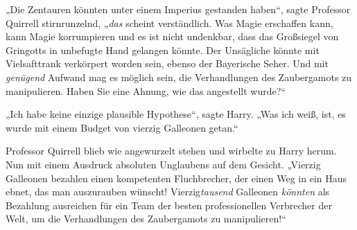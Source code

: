 „Die Zentauren könnten unter einem Imperius gestanden haben“, sagte Professor Quirrell stirnrunzelnd, „\emph{das} scheint verständlich. Was Magie erschaffen kann, kann Magie korrumpieren und es ist nicht undenkbar, dass das Großsiegel von Gringotts in unbefugte Hand gelangen könnte. Der Unsägliche könnte mit Vielsafttrank verkörpert worden sein, ebenso der Bayerische Seher.%
Und mit \emph{genügend} Aufwand mag es möglich sein, die Verhandlungen des Zaubergamots zu manipulieren. Haben Sie eine Ahnung, wie das angestellt wurde?“

„Ich habe keine einzige plausible Hypothese“, sagte Harry. „Was ich weiß, ist, es wurde mit einem Budget von vierzig Galleonen getan.“

Professor Quirrell blieb wie angewurzelt stehen und wirbelte zu Harry herum. Nun mit einem Ausdruck absoluten Unglaubens auf dem Gesicht. „Vierzig Galleonen bezahlen einen kompetenten Fluchbrecher, der einen Weg in ein Haus ebnet, das man auszurauben wünscht! Vierzig{}\emph{tausend} Galleonen \emph{könnten} als Bezahlung ausreichen für ein Team der besten professionellen Verbrecher der Welt, um die Verhandlungen des Zaubergamots zu manipulieren!“%

